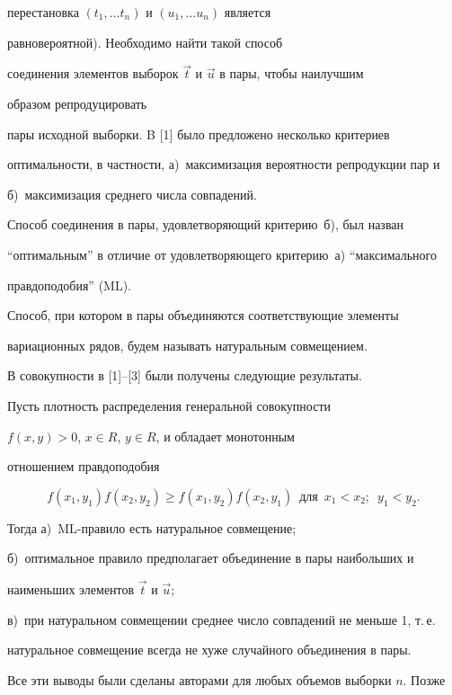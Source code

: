 перестановка $(t_1, \dotsc t_n)$ и $(u_1, \dotsc u_n)$ является


равновероятной). Необходимо найти такой способ


соединения элементов выборок $\Vec t $ и $\Vec u $  в пары, чтобы наилучшим


образом репродуцировать


пары исходной выборки. B [1] было предложено несколько критериев


оптимальности, в частности, а)~максимизация вероятности репродукции пар и


б)~максимизация среднего числа совпадений.


Способ соединения в пары, удовлетворяющий критерию~б), был назван


``оптимальным'' в отличие от удовлетворяющего критерию~а) ``максимального


правдоподобия'' (ML).


Способ, при котором в пары объединяются соответствующие элементы


вариационных рядов, будем называть натуральным совмещением.





В совокупности в [1]--[3] были получены следующие результаты.


Пусть плотность распределения генеральной совокупности


$f(x,y)>0$, $x \in R$, $y\in R$, и обладает монотонным


отношением правдоподобия


$$


f(x_1,y_1)f(x_2,y_2) \ge f(x_1,y_2)f(x_2,y_1)\ \;


\text{для} \ \; x_1<x_2; \ \; y_1<y_2.


$$


Тогда а)~ML-правило есть натуральное совмещение;


б)~оптимальное правило предполагает объединение в пары наибольших и


наименьших элементов $\Vec t$ и $\Vec u$;


в)~при натуральном совмещении среднее число совпадений  не меньше 1, т.\,е.


натуральное совмещение всегда не хуже случайного объединения в пары.





Все эти выводы были сделаны авторами для любых объемов выборки $n$. Позже


